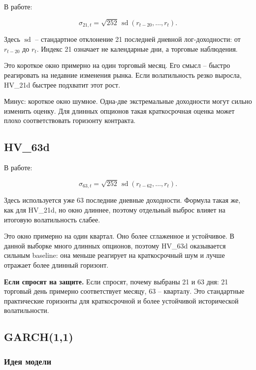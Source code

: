 \documentclass[11pt,a4paper]{article}
\newcommand{\answer}[1]{%
  \vspace{0.15em}
  \noindent\colorbox{softgreen}{%
    \parbox{\dimexpr\linewidth-2\fboxsep\relax}{\textbf{Если спросят на защите.} #1}%
  }\vspace{0.2em}
}
\begin{document}
В работе:

\begin{equation}
\sigma_{21,t} =
\sqrt{252}\,\operatorname{sd}(r_{t-20},\ldots,r_t).
\end{equation}

Здесь $\operatorname{sd}$ -- стандартное отклонение 21 последней дневной лог-доходности: от $r_{t-20}$ до $r_t$. Индекс 21 означает не календарные дни, а торговые наблюдения.

Это короткое окно примерно на один торговый месяц. Его смысл -- быстро реагировать на недавние изменения рынка. Если волатильность резко выросла, HV\_21d быстрее подхватит этот рост.

Минус: короткое окно шумное. Одна-две экстремальные доходности могут сильно изменить оценку. Для длинных опционов такая краткосрочная оценка может плохо соответствовать горизонту контракта.

\subsection{HV\_63d}

В работе:

\begin{equation}
\sigma_{63,t} =
\sqrt{252}\,\operatorname{sd}(r_{t-62},\ldots,r_t).
\end{equation}

Здесь используется уже 63 последние дневные доходности. Формула такая же, как для HV\_21d, но окно длиннее, поэтому отдельный выброс влияет на итоговую волатильность слабее.

Это окно примерно на один квартал. Оно более сглаженное и устойчивое. В данной выборке много длинных опционов, поэтому HV\_63d оказывается сильным baseline: она меньше реагирует на краткосрочный шум и лучше отражает более длинный горизонт.

\answer{Если спросят, почему выбраны 21 и 63 дня: 21 торговый день примерно соответствует месяцу, 63 -- кварталу. Это стандартные практические горизонты для краткосрочной и более устойчивой исторической волатильности.}

\subsection{GARCH(1,1)}

\subsubsection{Идея модели}
\end{document}
